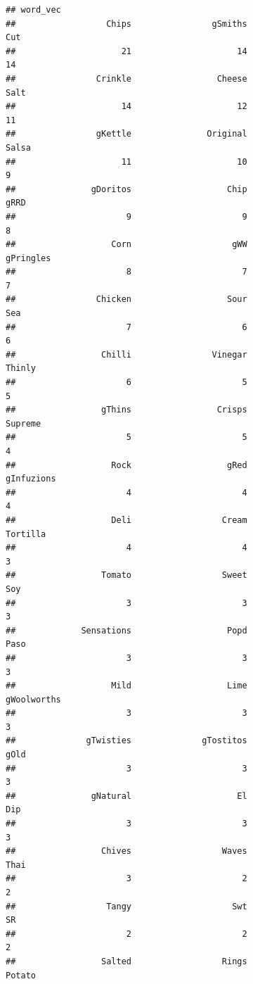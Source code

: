 \documentclass[
]{article}
\begin{document}
\begin{verbatim}
## word_vec
##                  Chips                gSmiths                    Cut 
##                     21                     14                     14 
##                Crinkle                 Cheese                   Salt 
##                     14                     12                     11 
##                gKettle               Original                  Salsa 
##                     11                     10                      9 
##               gDoritos                   Chip                   gRRD 
##                      9                      9                      8 
##                   Corn                    gWW              gPringles 
##                      8                      7                      7 
##                Chicken                   Sour                    Sea 
##                      7                      6                      6 
##                 Chilli                Vinegar                 Thinly 
##                      6                      5                      5 
##                 gThins                 Crisps                Supreme 
##                      5                      5                      4 
##                   Rock                   gRed             gInfuzions 
##                      4                      4                      4 
##                   Deli                  Cream               Tortilla 
##                      4                      4                      3 
##                 Tomato                  Sweet                    Soy 
##                      3                      3                      3 
##             Sensations                   Popd                   Paso 
##                      3                      3                      3 
##                   Mild                   Lime            gWoolworths 
##                      3                      3                      3 
##              gTwisties              gTostitos                   gOld 
##                      3                      3                      3 
##               gNatural                     El                    Dip 
##                      3                      3                      3 
##                 Chives                  Waves                   Thai 
##                      3                      2                      2 
##                  Tangy                    Swt                     SR 
##                      2                      2                      2 
##                 Salted                  Rings                 Potato 

\end{verbatim}
\end{document}
